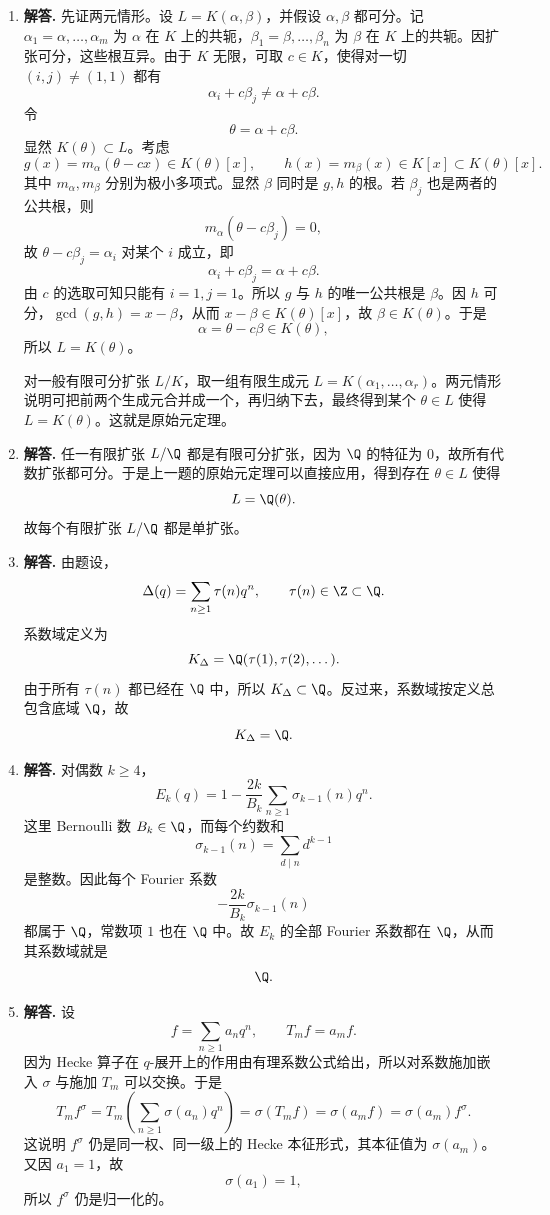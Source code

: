 \begin{enumerate}[label=\textbf{\arabic*.}, leftmargin=*, itemsep=1em]
\item \textbf{解答.} 先证两元情形。设 $L=K(\alpha,\beta)$，并假设 $\alpha,\beta$ 都可分。记 $\alpha_1=\alpha,\dots,\alpha_m$ 为 $\alpha$ 在 $K$ 上的共轭，$\beta_1=\beta,\dots,\beta_n$ 为 $\beta$ 在 $K$ 上的共轭。因扩张可分，这些根互异。由于 $K$ 无限，可取 $c\in K$，使得对一切 $(i,j)\ne(1,1)$ 都有
\[
\alpha_i+c\beta_j\ne \alpha+c\beta.
\]
令
\[
\theta=\alpha+c\beta.
\]
显然 $K(\theta)\subset L$。考虑
\[
g(x)=m_\alpha(\theta-cx)\in K(\theta)[x],
\qquad h(x)=m_\beta(x)\in K[x]\subset K(\theta)[x].
\]
其中 $m_\alpha,m_\beta$ 分别为极小多项式。显然 $\beta$ 同时是 $g,h$ 的根。若 $\beta_j$ 也是两者的公共根，则
\[
m_\alpha(\theta-c\beta_j)=0,
\]
故 $\theta-c\beta_j=\alpha_i$ 对某个 $i$ 成立，即
\[
\alpha_i+c\beta_j=\alpha+c\beta.
\]
由 $c$ 的选取可知只能有 $i=1,j=1$。所以 $g$ 与 $h$ 的唯一公共根是 $\beta$。因 $h$ 可分，$\gcd(g,h)=x-\beta$，从而 $x-\beta\in K(\theta)[x]$，故 $\beta\in K(\theta)$。于是
\[
\alpha=\theta-c\beta\in K(\theta),
\]
所以 $L=K(\theta)$。

对一般有限可分扩张 $L/K$，取一组有限生成元 $L=K(\alpha_1,\dots,\alpha_r)$。两元情形说明可把前两个生成元合并成一个，再归纳下去，最终得到某个 $\theta\in L$ 使得 $L=K(\theta)$。这就是原始元定理。

\item \textbf{解答.} 任一有限扩张 $L/\Q$ 都是有限可分扩张，因为 $\Q$ 的特征为 $0$，故所有代数扩张都可分。于是上一题的原始元定理可以直接应用，得到存在 $\theta\in L$ 使得
\[
L=\Q(\theta).
\]
故每个有限扩张 $L/\Q$ 都是单扩张。

\item \textbf{解答.} 由题设，
\[
\Delta(q)=\sum_{n\ge1}\tau(n)q^n,
\qquad \tau(n)\in\Z\subset\Q.
\]
系数域定义为
\[
K_\Delta=\Q(\tau(1),\tau(2),\dots).
\]
由于所有 $\tau(n)$ 都已经在 $\Q$ 中，所以 $K_\Delta\subset\Q$。反过来，系数域按定义总包含底域 $\Q$，故
\[
K_\Delta=\Q.
\]

\item \textbf{解答.} 对偶数 $k\ge4$，
\[
E_k(q)=1-\frac{2k}{B_k}\sum_{n\ge1}\sigma_{k-1}(n)q^n.
\]
这里 Bernoulli 数 $B_k\in\Q$，而每个约数和
\[
\sigma_{k-1}(n)=\sum_{d\mid n} d^{k-1}
\]
是整数。因此每个 Fourier 系数
\[
-\frac{2k}{B_k}\sigma_{k-1}(n)
\]
都属于 $\Q$，常数项 $1$ 也在 $\Q$ 中。故 $E_k$ 的全部 Fourier 系数都在 $\Q$，从而其系数域就是
\[
\Q.
\]

\item \textbf{解答.} 设
\[
f=\sum_{n\ge1} a_nq^n,
\qquad T_mf=a_mf.
\]
因为 Hecke 算子在 $q$-展开上的作用由有理系数公式给出，所以对系数施加嵌入 $\sigma$ 与施加 $T_m$ 可以交换。于是
\[
T_mf^\sigma=T_m\left(\sum_{n\ge1}\sigma(a_n)q^n\right)=\sigma(T_mf)=\sigma(a_mf)=\sigma(a_m)f^\sigma.
\]
这说明 $f^\sigma$ 仍是同一权、同一级上的 Hecke 本征形式，其本征值为 $\sigma(a_m)$。又因 $a_1=1$，故
\[
\sigma(a_1)=1,
\]
所以 $f^\sigma$ 仍是归一化的。


\end{enumerate}
